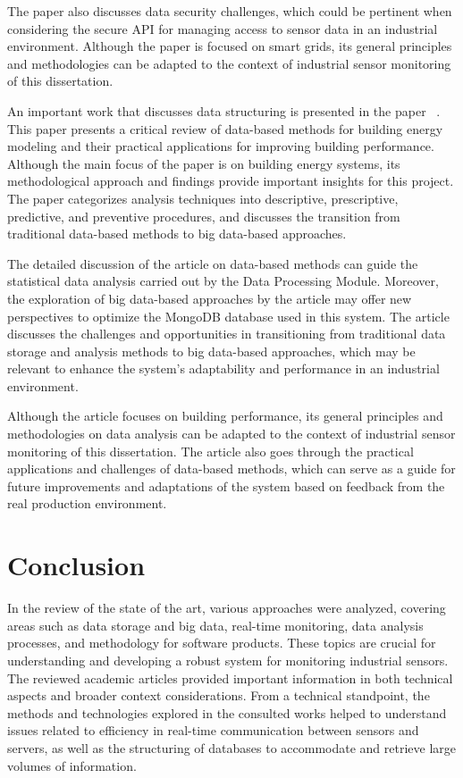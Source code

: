 The paper also discusses data security challenges, which could be pertinent when considering the secure \gls{API} for managing access to sensor data in an industrial environment. Although the paper is focused on smart grids, its general principles and methodologies can be adapted to the context of industrial sensor monitoring of this dissertation.

An important work that discusses data structuring is presented in the paper ~\cite{Fan2021}. This paper presents a critical review of data-based methods for building energy modeling and their practical applications for improving building performance. Although the main focus of the paper is on building energy systems, its methodological approach and findings provide important insights for this project. The paper categorizes analysis techniques into descriptive, prescriptive, predictive, and preventive procedures, and discusses the transition from traditional data-based methods to big data-based approaches.

The detailed discussion of the article on data-based methods can guide the statistical data analysis carried out by the Data Processing Module. Moreover, the exploration of big data-based approaches by the article may offer new perspectives to optimize the MongoDB database used in this system. The article discusses the challenges and opportunities in transitioning from traditional data storage and analysis methods to big data-based approaches, which may be relevant to enhance the system's adaptability and performance in an industrial environment.

Although the article focuses on building performance, its general principles and methodologies on data analysis can be adapted to the context of industrial sensor monitoring of this dissertation. The article also goes through the practical applications and challenges of data-based methods, which can serve as a guide for future improvements and adaptations of the system based on feedback from the real production environment.


\section{Conclusion}
In the review of the state of the art, various approaches were analyzed, covering areas such as data storage and big data, real-time monitoring, data analysis processes, and methodology for software products. These topics are crucial for understanding and developing a robust system for monitoring industrial sensors. The reviewed academic articles provided important information in both technical aspects and broader context considerations. From a technical standpoint, the methods and technologies explored in the consulted works helped to understand issues related to efficiency in real-time communication between sensors and servers, as well as the structuring of databases to accommodate and retrieve large volumes of information.

